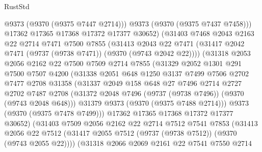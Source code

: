 \begin{lexlean}{RustStd}
\begin{coremodule}
                  @9373
                  (@9370 (@9375 @7447 @2714)))
                @9373
                (@9370 (@9375 @7437 @7458)))
              @17362
              @17365
              @17368
              @17372
              @17377
              @30652)
            (@31403
              @7468
              @2043
              @2163
              @22
              @2714
              @7471
              @7500
              @7855
              (@31413
                @2043
                @22
                @7471
                (@31417 @2042 @7471 (@9737 (@9738 @7471)) (@9370 (@9743 @2042 @22))))
              (@31318
                @2053
                @2056
                @2162
                @22
                @7500
                @7509
                @2714
                @7855
                (@31329
                  @2052
                  @1301
                  @291
                  @7500
                  @7507
                  @4200
                  (@31338
                    @2051
                    @648
                    @1250
                    @3137
                    @7499
                    @7506
                    @2702
                    @7477
                    @2708
                    @31358
                    (@31337
                      @2049
                      @158
                      @648
                      @27
                      @7496
                      @2714
                      @2727
                      @2702
                      @7487
                      @2708
                      (@31372 @2048 @7496 (@9737 (@9738 @7496)) (@9370 (@9743 @2048 @648)))
                      @31379
                      @9373
                      (@9370 (@9375 @7488 @2714)))
                    @9373
                    (@9370 (@9375 @7478 @7499)))
                  @17362
                  @17365
                  @17368
                  @17372
                  @17377
                  @30652)
                (@31403
                  @7509
                  @2056
                  @2162
                  @22
                  @2714
                  @7512
                  @7541
                  @7853
                  (@31413
                    @2056
                    @22
                    @7512
                    (@31417 @2055 @7512 (@9737 (@9738 @7512)) (@9370 (@9743 @2055 @22))))
                  (@31318
                    @2066
                    @2069
                    @2161
                    @22
                    @7541
                    @7550
                    @2714

\end{coremodule}
\end{lexlean}
